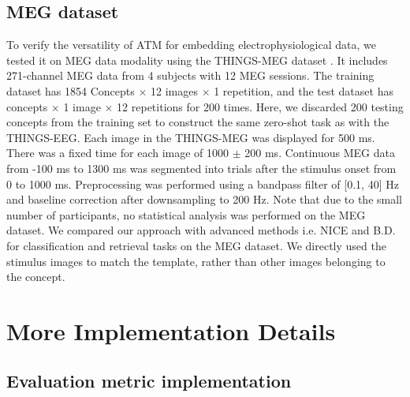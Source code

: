 \documentclass{article}
\begin{document}
\subsection{MEG dataset} 
To verify the versatility of ATM for embedding electrophysiological data, we tested it on MEG data modality using the THINGS-MEG dataset \cite{hebart2023things}. It includes 271-channel MEG data from 4 subjects with 12 MEG sessions. The training dataset has 1854 Concepts \(\times\) 12 images \(\times\) 1 repetition, and the test dataset has concepts \(\times\) 1 image \(\times\) 12 repetitions for 200 times. Here, we discarded 200 testing concepts from the training set to construct the same zero-shot task as with the THINGS-EEG. Each image in the THINGS-MEG was displayed for 500 ms. There was a fixed time for each image of 1000 \(\pm\) 200 ms. Continuous MEG data from -100 ms to 1300 ms was segmented into trials after the stimulus onset from 0 to 1000 ms. Preprocessing was performed using a bandpass filter of [0.1, 40] Hz and baseline correction after downsampling to 200 Hz. Note that due to the small number of participants, no statistical analysis was performed on the MEG dataset. We compared our approach with advanced methods i.e. NICE \cite{song2023decoding} and B.D. \cite{Benchetrit_2023} for classification and retrieval tasks on the MEG dataset. We directly used the stimulus images to match the template, rather than other images belonging to the concept.





\section{More Implementation Details}
\label{sec:More_Implementation_Details}



\subsection{Evaluation metric implementation}
\label{subsec:metric}
\end{document}
